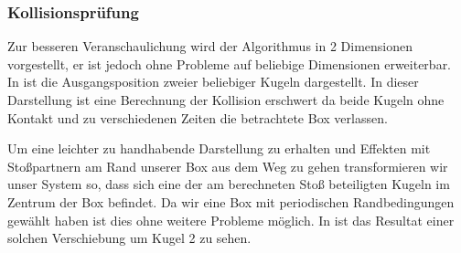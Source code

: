 \subsubsection{Kollisionsprüfung} %

\newcommand{\BoxW}{10}
\newcommand{\BoxH}{7}
\newcommand{\Kradius}{.7}

\newcommand{\Kx}{7}
\newcommand{\Ky}{6}

\newcommand{\vxa}{6/3}
\newcommand{\vya}{2/3}
\newcommand{\vxb}{-5/3}
\newcommand{\vyb}{3/3}

\newcommand{\Dx}{-2.5}
\newcommand{\Dy}{-5}

\newcommand{\BoxC}{\BoxW / 2 , \BoxH / 2}
\newcommand{\BoxWh}{\BoxW / 2}
\newcommand{\BoxHh}{\BoxH / 2}

\newcommand{\drawKugel}[1]{
    \draw[fill=black] 	(#1) circle (0.15em);
    \draw		(#1) circle (\Kradius);
}

\newcommand{\dis}{r_{21}}
\newcommand{\vdis}{\vec{r}_{21}}
\newcommand{\vdissq}{\left|\vdis\right|^2}

\newcommand{\vel}{v_{21}}
\newcommand{\vvel}{\vec{v}_{21}}
\newcommand{\vvelsq}{\left|\vvel\right|^2}
\newcommand{\dia}{d}

Zur besseren Veranschaulichung wird der Algorithmus in 2 Dimensionen vorgestellt, er ist jedoch ohne Probleme auf beliebige Dimensionen erweiterbar.\\
In  ist die Ausgangsposition zweier beliebiger Kugeln dargestellt. In dieser Darstellung ist eine Berechnung der Kollision erschwert da beide Kugeln ohne Kontakt und zu verschiedenen Zeiten die betrachtete Box verlassen.



Um eine leichter zu handhabende Darstellung zu erhalten und Effekten mit Stoßpartnern am Rand unserer Box aus dem Weg zu gehen transformieren wir unser System so, dass sich eine der am berechneten Stoß beteiligten Kugeln im Zentrum der Box befindet. Da wir eine Box mit periodischen Randbedingungen gewählt haben ist dies ohne weitere Probleme möglich. In  ist das Resultat einer solchen Verschiebung um Kugel 2 zu sehen.

